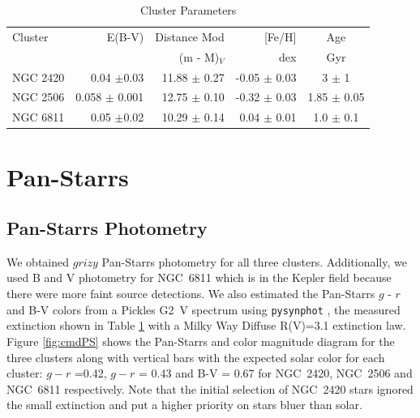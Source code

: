 \documentclass{aastex6}
\newcommand{\DHSresApprox}{300}
\begin{document}
\begin{table}
\centering
\caption{Cluster Parameters}\label{tab:clusterProp}
\begin{tabular}{lrrrc}
\hline \hline
Cluster   					&  E(B-V) 			& Distance Mod 	& [Fe/H] 			& Age \\
          					&     				&    (m - M)$_V$	& 	dex 			& Gyr \\
\hline \hline
NGC 2420\tablenotemark{a}	& 0.04 $\pm$0.03	&  11.88 $\pm$ 0.27	& -0.05 $\pm$ 0.03	& 3 $\pm$ 1 \\
NGC 2506\tablenotemark{b}	& 0.058 $\pm$ 0.001	&  12.75 $\pm$ 0.10 	& -0.32 $\pm$ 0.03	& 1.85 $\pm$ 0.05 \\
NGC 6811\tablenotemark{c}	& 0.05 $\pm$0.02	& 10.29 $\pm$ 0.14	& 0.04 $\pm$ 0.01 	& 1.0 $\pm$ 0.1 \\
\hline
\end{tabular}
\end{table}

\section{Pan-Starrs}
\subsection{Pan-Starrs Photometry}

We obtained $grizy$ Pan-Starrs photometry \citep{magnier2013photLadder,schlafly2012photcal,tonry2012panstarrsPhot} for all three clusters.
Additionally, we used \citet{janes2013keplerPhot} B and V photometry for NGC~6811 which is in the Kepler field because there were more faint source detections.
We also estimated the Pan-Starrs $g$ - $r$ and B-V colors from a Pickles G2~V spectrum using \texttt{pysynphot} \citep{lim2015pysynphot}, the measured extinction shown in Table \ref{tab:clusterProp} with a Milky Way Diffuse R(V)=3.1 \citet{cardelli1989} extinction law.
Figure \ref{fig:cmdPS} shows the Pan-Starrs and \citet{janes2013keplerPhot} color magnitude diagram for the three clusters along with vertical bars with the expected solar color for each cluster: $g-r$ =0.42, $g-r$ = 0.43 and B-V = 0.67 for NGC~2420, NGC~2506 and NGC~6811 respectively.
Note that the initial selection of NGC~2420 stars ignored the small extinction and put a higher priority on stars bluer than solar.
\end{document}
